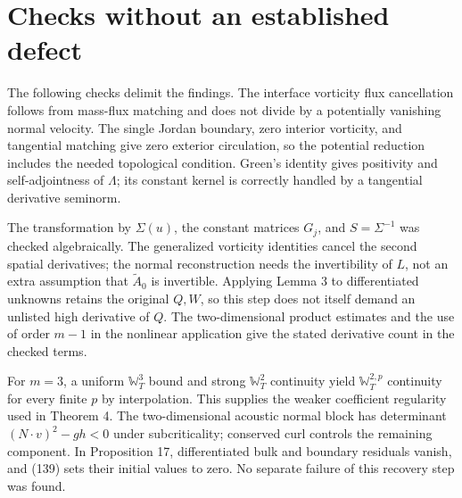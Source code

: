 \documentclass[10pt]{article}
\begin{document}
\section*{Checks without an established defect}
The following checks delimit the findings. The interface vorticity flux cancellation follows from mass-flux matching and does not divide by a potentially vanishing normal velocity. The single Jordan boundary, zero interior vorticity, and tangential matching give zero exterior circulation, so the potential reduction includes the needed topological condition. Green’s identity gives positivity and self-adjointness of \(\Lambda\); its constant kernel is correctly handled by a tangential derivative seminorm.\par
The transformation by \(\Sigma(u)\), the constant matrices \(G_j\), and \(S=\Sigma^{-1}\) was checked algebraically. The generalized vorticity identities cancel the second spatial derivatives; the normal reconstruction needs the invertibility of \(L\), not an extra assumption that \(\widetilde A_0\) is invertible. Applying Lemma 3 to differentiated unknowns retains the original \(Q,W\), so this step does not itself demand an unlisted high derivative of \(Q\). The two-dimensional product estimates and the use of order \(m-1\) in the nonlinear application give the stated derivative count in the checked terms.\par
For \(m=3\), a uniform \(\mathbb W_T^3\) bound and strong \(\mathbb W_T^2\) continuity yield \(\mathbb W_T^{2,p}\) continuity for every finite \(p\) by interpolation. This supplies the weaker coefficient regularity used in Theorem 4. The two-dimensional acoustic normal block has determinant \((N\cdot v)^2-gh<0\) under subcriticality; conserved curl controls the remaining component. In Proposition 17, differentiated bulk and boundary residuals vanish, and (139) sets their initial values to zero. No separate failure of this recovery step was found.\par
\end{document}
